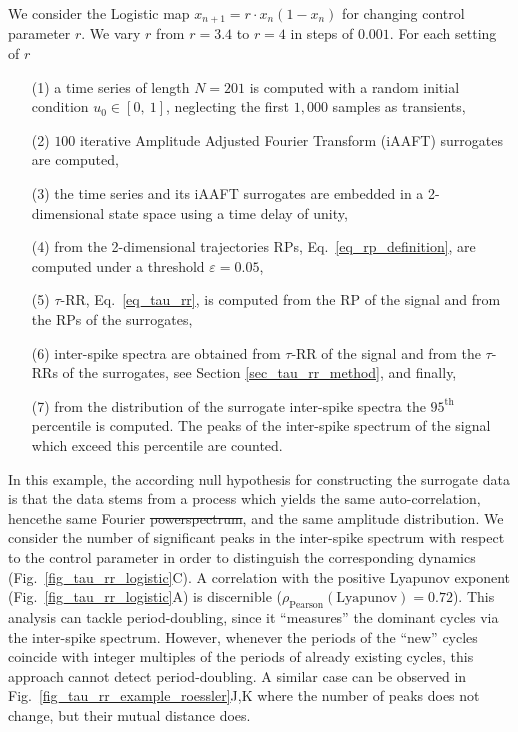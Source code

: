 \documentclass[entropy,article,submit,pdftex,moreauthors]{Definitions/mdpi}
\providecommand{\DIFadd}[1]{{\protect\color{blue}\uwave{#1}}} %
\providecommand{\DIFdel}[1]{{\protect\color{red}\sout{#1}}}                      %
\providecommand{\DIFaddbegin}{} %
\providecommand{\DIFaddend}{} %
\providecommand{\DIFdelbegin}{} %
\providecommand{\DIFdelend}{} %
\begin{document}
We consider the Logistic map $x_{n+1}=r\cdot x_n \left( 1-x_n \right)$ for changing control parameter $r$. We vary $r$ from $r=3.4$ to $r=4$ in steps of $0.001$. For 
each setting of $r$ 
\begin{itemize}[noitemsep]
\item[(1)] a time series of length $N=201$ is computed with a random initial condition $u_0 \in [0,\ 1]$, neglecting the first $1,000$ samples as transients,
\item[(2)] $100$ iterative Amplitude Adjusted Fourier Transform (iAAFT) surrogates \cite{Schreiber1996,Schreiber2000} are computed,
\item[(3)] the time series and its iAAFT surrogates are embedded in a 2-dimensional state space using a time delay of unity,
\item[(4)] from the 2-dimensional trajectories RPs, Eq.~\eqref{eq_rp_definition}, are computed under a threshold $\varepsilon=0.05$,
\item[(5)] $\tau$-RR, Eq.~\eqref{eq_tau_rr}, is computed from the RP of the signal and from the RPs of the surrogates,
\item[(6)] inter-spike spectra are obtained from $\tau$-RR of the signal and from the $\tau$-RRs of the surrogates, see Section \ref{sec_tau_rr_method}, and finally,
\item[(7)] from the distribution of the surrogate inter-spike spectra the $95^\text{th}$ percentile is computed. The peaks of the inter-spike spectrum of the signal which exceed 
this percentile are counted. 
\end{itemize}
In this example, the according null hypothesis for constructing the surrogate data is that the data stems from a process which yields the same auto-correlation, 
hence\DIFaddbegin \DIFadd{, }\DIFaddend the same Fourier \DIFdelbegin \DIFdel{powerspectrum}\DIFdelend \DIFaddbegin \DIFadd{power spectral density}\DIFaddend , and the same 
amplitude distribution. We consider the number of significant peaks in the inter-spike spectrum with
respect to the control parameter in order to distinguish the corresponding dynamics (Fig.~\ref{fig_tau_rr_logistic}C).
A correlation with the positive Lyapunov exponent (Fig.~\ref{fig_tau_rr_logistic}A) is discernible 
($\rho_{\text{Pearson}}(\text{Lyapunov})=0.72$). This analysis can tackle period-doubling, since it ``measures'' the dominant cycles via the inter-spike spectrum. 
However, whenever the periods of the ``new'' cycles coincide with integer multiples of the periods of already existing cycles, this approach cannot detect 
period-doubling. A similar case can be observed in Fig.~\ref{fig_tau_rr_example_roessler}J,K where the number of peaks does not change, but  their mutual distance does. 
\end{document}
